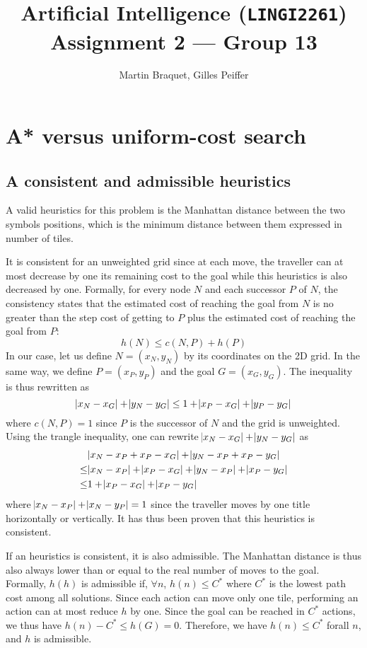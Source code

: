 \documentclass[journal]{IEEEtran}
\title{Artificial Intelligence (\texttt{LINGI2261}) \\ Assignment 2 --- Group 13}
\author{Martin Braquet, Gilles Peiffer}
\begin{document}
\maketitle

\section{A* versus uniform-cost search}

\subsection{A consistent and admissible heuristics}

A valid heuristics for this problem is the Manhattan distance between the two symbols positions, which is the minimum distance between them expressed in number of tiles.

It is consistent for an unweighted grid since at each move, the traveller can at most decrease by one its remaining cost to the goal while this heuristics is also decreased by one. Formally, for every node $N$ and each successor $P$ of $N$, the consistency states that the estimated cost of reaching the goal from $N$ is no greater than the step cost of getting to $P$ plus the estimated cost of reaching the goal from $P$:
\[
 h(N) \le c(N,P) + h(P)
\]
In our case, let us define $N = (x_N, y_N)$ by its coordinates on the 2D grid. In the same way, we define $P = (x_P, y_P)$ and the goal $G = (x_G, y_G)$. The inequality is thus rewritten as
\[
 \abs{x_N - x_G} + \abs{y_N - y_G} \le 1 + \abs{x_P - x_G} + \abs{y_P - y_G}
\]
where $c(N,P) = 1$ since $P$ is the successor of $N$ and the grid is unweighted. Using the trangle inequality, one can rewrite $\abs{x_N - x_G} + \abs{y_N - y_G}$ as 
\begin{align*}
   & \abs{x_N - x_P + x_P - x_G} + \abs{y_N - x_P + x_P - y_G} \\
  \le & \abs{x_N - x_P} + \abs{x_P - x_G} + \abs{y_N - x_P} + \abs{x_P - y_G} \\
  \le & 1 + \abs{x_P - x_G} + \abs{x_P - y_G}
\end{align*}
where $\abs{x_N - x_P} + \abs{x_N - y_P} = 1$ since the traveller moves by one title horizontally or vertically. It has thus been proven that this heuristics is consistent.

If an heuristics is consistent, it is also admissible.
The Manhattan distance is thus also always lower than or equal to the real number of moves to the goal. Formally, $h(h)$ is admissible if, $\forall n$, $h(n) \le C^*$ where $C^*$ is the lowest path cost among all solutions. Since each action can move only one tile, performing an action can at most reduce $h$ by one. Since the goal can be reached in $C^*$ actions, we thus have $h(n) - C^* \le h(G) = 0$. Therefore, we have $h(n) \le C^*$ forall $n$, and $h$ is admissible.
\end{document}
